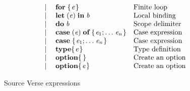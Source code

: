 \documentclass[acmsmall,screen]{acmart}\settopmatter{}
\newcommand{\Varid}[1]{\mathit{#1}}
\newcommand{\vb}{\; \ensuremath{\mathop{\mid}} \;}
\newenvironment{figurebox}{\begin{figure}\begin{framed}}{\end{framed}\end{figure}}
\begin{document}
\begin{figurebox}
$$\begin{array}{rcll}
      & \vb & \ensuremath{\textbf{for}\;\{\mskip1.5mu \Varid{e}\mskip1.5mu\}}          & \text{Finite loop} \\
      & \vb & \ensuremath{\mathbf{let}\;(\Varid{e})\;\textbf{in}\;\Varid{b}}     & \text{Local binding} \\
      & \vb & \ensuremath{\textbf{do}\;\Varid{b}}            & \text{Scope delimiter} \\
      & \vb & \ensuremath{\textbf{case}\;(\Varid{e})\;\textbf{of}\;\{\mskip1.5mu \Varid{e}_{\mathrm{1}};\,\!\ldots\!\;\Varid{e}_{\Varid{n}}\mskip1.5mu\}}    & \text{Case expression} \\
      & \vb & \ensuremath{\textbf{case}\;\{\mskip1.5mu \Varid{e}_{\mathrm{1}};\,\!\ldots\!\;\Varid{e}_{\Varid{n}}\mskip1.5mu\}} & \text{Case expression} \\
      & \vb & \ensuremath{\textbf{type} \{\mskip1.5mu \Varid{e}\mskip1.5mu\}}         & \text{Type definition} \\
      & \vb & \ensuremath{\textbf{option} \{\mskip1.5mu \mskip1.5mu\}}        & \text{Create an option} \\
      & \vb & \ensuremath{\textbf{option} \{\mskip1.5mu \Varid{e}\mskip1.5mu\}}       & \text{Create an option} \\
\end{array}
$$
\caption{Source Verse expressions} \label{fig:source-verse-expr}
\end{figurebox}
\end{document}
